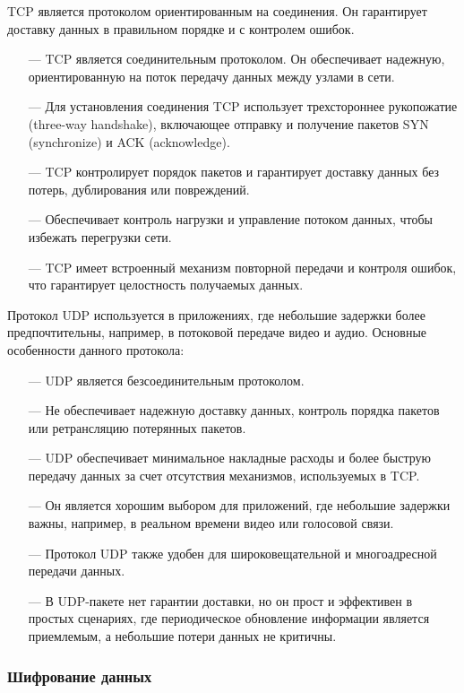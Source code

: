 TCP является протоколом ориентированным на соединения. Он гарантирует доставку данных в правильном порядке и с контролем ошибок.

\begin{itemize}
	\item [---] TCP является соединительным протоколом. Он обеспечивает надежную, ориентированную на поток передачу данных между узлами в сети.
	\item [---] Для установления соединения TCP использует трехстороннее рукопожатие (three-way handshake), включающее отправку и получение пакетов SYN (synchronize) и ACK (acknowledge).
	\item [---] TCP контролирует порядок пакетов и гарантирует доставку данных без потерь, дублирования или повреждений.
	\item [---] Обеспечивает контроль нагрузки и управление потоком данных, чтобы избежать перегрузки сети.
	\item [---] TCP имеет встроенный механизм повторной передачи и контроля ошибок, что гарантирует целостность получаемых данных.
\end{itemize}

Протокол UDP используется в приложениях, где небольшие задержки более предпочтительны, например, в потоковой передаче видео и аудио. Основные особенности данного протокола:

\begin{itemize}
	\item [---] UDP является безсоединительным протоколом.
	\item [---] Не обеспечивает надежную доставку данных, контроль порядка пакетов или ретрансляцию потерянных пакетов.
	\item [---] UDP обеспечивает минимальное накладные расходы и более быструю передачу данных за счет отсутствия механизмов, используемых в TCP.
	\item [---] Он является хорошим выбором для приложений, где небольшие задержки важны, например, в реальном времени видео или голосовой связи.
	\item [---] Протокол UDP также удобен для широковещательной и многоадресной передачи данных.
	\item [---] В UDP-пакете нет гарантии доставки, но он прост и эффективен в простых сценариях, где периодическое обновление информации является приемлемым, а небольшие потери данных не критичны.
\end{itemize}

\subsubsection{Шифрование данных}

